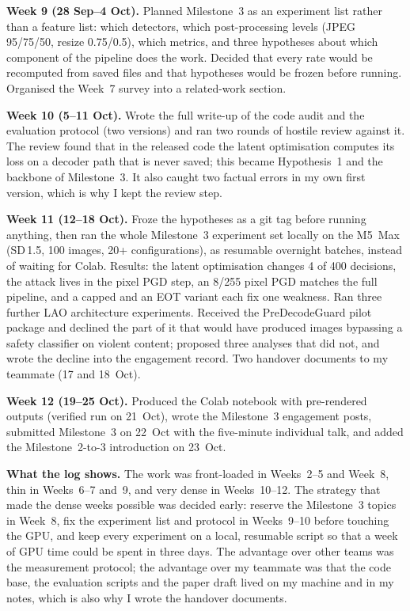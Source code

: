 \documentclass[journal]{IEEEtran}
\begin{document}
\textbf{Week 9 (28 Sep--4 Oct).} Planned Milestone~3 as an experiment list rather than a feature list: which detectors, which post-processing levels (JPEG 95/75/50, resize 0.75/0.5), which metrics, and three hypotheses about which component of the pipeline does the work. Decided that every rate would be recomputed from saved files and that hypotheses would be frozen before running. Organised the Week~7 survey into a related-work section.

\textbf{Week 10 (5--11 Oct).} Wrote the full write-up of the code audit and the evaluation protocol (two versions) and ran two rounds of hostile review against it. The review found that in the released code the latent optimisation computes its loss on a decoder path that is never saved; this became Hypothesis~1 and the backbone of Milestone~3. It also caught two factual errors in my own first version, which is why I kept the review step.

\textbf{Week 11 (12--18 Oct).} Froze the hypotheses as a git tag before running anything, then ran the whole Milestone~3 experiment set locally on the M5~Max (SD\,1.5, 100 images, 20+ configurations), as resumable overnight batches, instead of waiting for Colab. Results: the latent optimisation changes 4 of 400 decisions, the attack lives in the pixel PGD step, an 8/255 pixel PGD matches the full pipeline, and a capped and an EOT variant each fix one weakness. Ran three further LAO architecture experiments. Received the PreDecodeGuard pilot package and declined the part of it that would have produced images bypassing a safety classifier on violent content; proposed three analyses that did not, and wrote the decline into the engagement record. Two handover documents to my teammate (17 and 18~Oct).

\textbf{Week 12 (19--25 Oct).} Produced the Colab notebook with pre-rendered outputs (verified run on 21~Oct), wrote the Milestone~3 engagement posts, submitted Milestone~3 on 22~Oct with the five-minute individual talk, and added the Milestone~2-to-3 introduction on 23~Oct.

\textbf{What the log shows.} The work was front-loaded in Weeks~2--5 and Week~8, thin in Weeks~6--7 and~9, and very dense in Weeks~10--12. The strategy that made the dense weeks possible was decided early: reserve the Milestone~3 topics in Week~8, fix the experiment list and protocol in Weeks~9--10 before touching the GPU, and keep every experiment on a local, resumable script so that a week of GPU time could be spent in three days. The advantage over other teams was the measurement protocol; the advantage over my teammate was that the code base, the evaluation scripts and the paper draft lived on my machine and in my notes, which is also why I wrote the handover documents.
\end{document}
